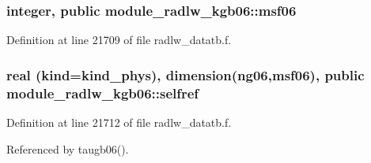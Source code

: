\subsubsection[{\texorpdfstring{msf06}{msf06}}]{\setlength{\rightskip}{0pt plus 5cm}integer, public module\+\_\+radlw\+\_\+kgb06\+::msf06}\hypertarget{namespacemodule__radlw__kgb06_a65f808aeb87457d383dd7f9366878fb9}{}\label{namespacemodule__radlw__kgb06_a65f808aeb87457d383dd7f9366878fb9}


Definition at line 21709 of file radlw\+\_\+datatb.\+f.

\subsubsection[{\texorpdfstring{selfref}{selfref}}]{\setlength{\rightskip}{0pt plus 5cm}real (kind=kind\+\_\+phys), dimension(ng06,{\bf msf06}), public module\+\_\+radlw\+\_\+kgb06\+::selfref}\hypertarget{namespacemodule__radlw__kgb06_a98901725947a4477924a47af5e67277e}{}\label{namespacemodule__radlw__kgb06_a98901725947a4477924a47af5e67277e}


Definition at line 21712 of file radlw\+\_\+datatb.\+f.



Referenced by taugb06().

